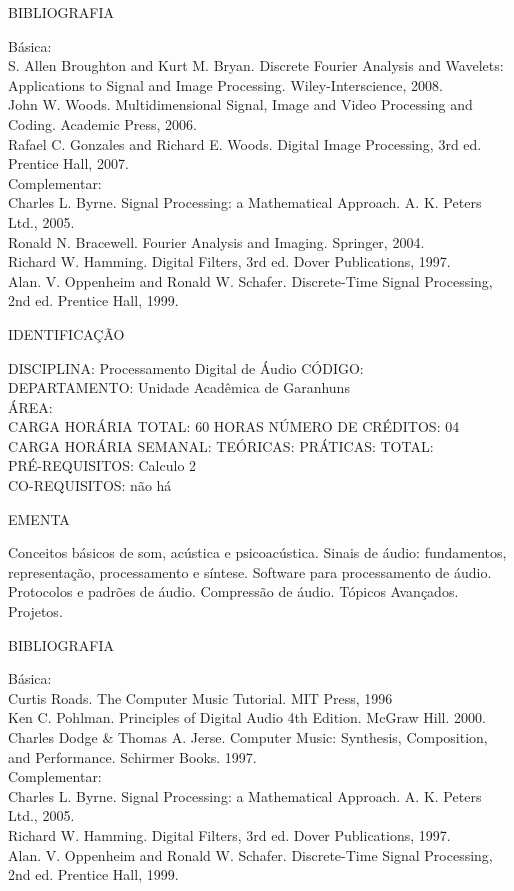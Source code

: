 \documentclass[
	12pt,				%
	openright,			%
  oneside,     %
	a4paper,			%
	english,			%
	french,				%
	spanish,			%
	brazil				%
	]{abntex2}
\begin{document}
\begin{apendicesenv}
BIBLIOGRAFIA 

Básica:\\
S. Allen Broughton and Kurt M. Bryan. Discrete Fourier Analysis and
Wavelets: Applications to Signal and Image Processing.
Wiley-Interscience, 2008.\\
John W. Woods. Multidimensional Signal, Image and Video Processing and
Coding. Academic Press, 2006.\\
Rafael C. Gonzales and Richard E. Woods. Digital Image Processing, 3rd
ed. Prentice Hall, 2007.\\
Complementar:\\
Charles L. Byrne. Signal Processing: a Mathematical Approach. A. K.
Peters Ltd., 2005.\\
Ronald N. Bracewell. Fourier Analysis and Imaging. Springer, 2004.\\
Richard W. Hamming. Digital Filters, 3rd ed. Dover Publications, 1997.\\
Alan. V. Oppenheim and Ronald W. Schafer. Discrete-Time Signal
Processing, 2nd ed. Prentice Hall, 1999.

\newpage IDENTIFICAÇÃO

DISCIPLINA: Processamento Digital de Áudio CÓDIGO:\\ 
DEPARTAMENTO: Unidade Acadêmica de Garanhuns\\
ÁREA: \\
CARGA HORÁRIA TOTAL: 60 HORAS NÚMERO DE CRÉDITOS: 04\\
CARGA HORÁRIA SEMANAL: TEÓRICAS: PRÁTICAS: TOTAL: \\
PRÉ-REQUISITOS: Calculo 2\\
CO-REQUISITOS: não há

EMENTA 

Conceitos básicos de som, acústica e psicoacústica. Sinais de áudio:
fundamentos, representação, processamento e síntese. Software para
processamento de áudio. Protocolos e padrões de áudio. Compressão de
áudio. Tópicos Avançados. Projetos.

BIBLIOGRAFIA 

Básica:\\
Curtis Roads. The Computer Music Tutorial. MIT Press, 1996\\
Ken C. Pohlman. Principles of Digital Audio 4th Edition. McGraw Hill.
2000.\\
Charles Dodge \& Thomas A. Jerse. Computer Music: Synthesis,
Composition, and Performance. Schirmer Books. 1997.\\
Complementar:\\
Charles L. Byrne. Signal Processing: a Mathematical Approach. A. K.
Peters Ltd., 2005.\\
Richard W. Hamming. Digital Filters, 3rd ed. Dover Publications, 1997.\\
Alan. V. Oppenheim and Ronald W. Schafer. Discrete-Time Signal
Processing, 2nd ed. Prentice Hall, 1999.


\end{apendicesenv}
\end{document}

